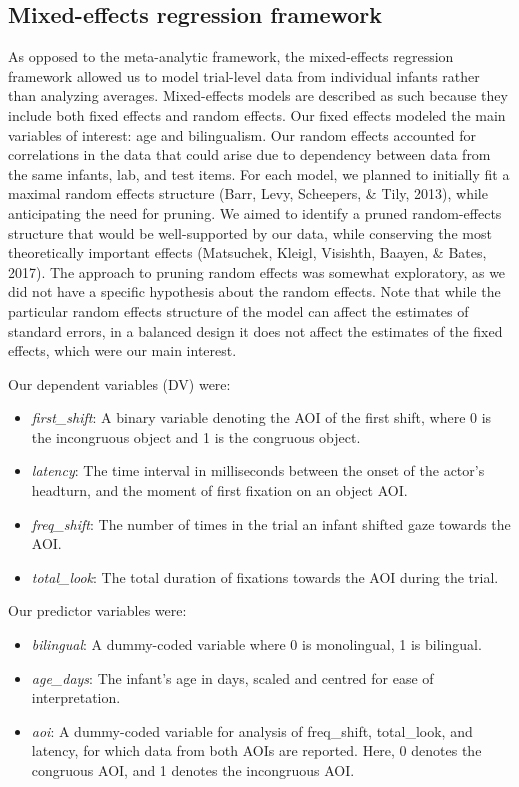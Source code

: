 \documentclass[,man,floatsintext]{apa6}
\begin{document}
\hypertarget{mixed-effects-regression-framework}{%
\subsection{Mixed-effects regression framework}\label{mixed-effects-regression-framework}}

As opposed to the meta-analytic framework, the mixed-effects regression framework allowed us to model trial-level data from individual infants rather than analyzing averages. Mixed-effects models are described as such because they include both fixed effects and random effects. Our fixed effects modeled the main variables of interest: age and bilingualism. Our random effects accounted for correlations in the data that could arise due to dependency between data from the same infants, lab, and test items. For each model, we planned to initially fit a maximal random effects structure (Barr, Levy, Scheepers, \& Tily, 2013), while anticipating the need for pruning. We aimed to identify a pruned random-effects structure that would be well-supported by our data, while conserving the most theoretically important effects (Matsuchek, Kleigl, Visishth, Baayen, \& Bates, 2017). The approach to pruning random effects was somewhat exploratory, as we did not have a specific hypothesis about the random effects. Note that while the particular random effects structure of the model can affect the estimates of standard errors, in a balanced design it does not affect the estimates of the fixed effects, which were our main interest.

Our dependent variables (DV) were:

\begin{itemize}
\item
  \emph{first\_shift}: A binary variable denoting the AOI of the first shift, where 0 is the incongruous object and 1 is the congruous object.
\item
  \emph{latency}: The time interval in milliseconds between the onset of the actor's headturn, and the moment of first fixation on an object AOI.
\item
  \emph{freq\_shift}: The number of times in the trial an infant shifted gaze towards the AOI.
\item
  \emph{total\_look}: The total duration of fixations towards the AOI during the trial.
\end{itemize}

Our predictor variables were:

\begin{itemize}
\item
  \emph{bilingual}: A dummy-coded variable where 0 is monolingual, 1 is bilingual.
\item
  \emph{age\_days}: The infant's age in days, scaled and centred for ease of interpretation.
\item
  \emph{aoi}: A dummy-coded variable for analysis of freq\_shift, total\_look, and latency, for which data from both AOIs are reported. Here, 0 denotes the congruous AOI, and 1 denotes the incongruous AOI.
\end{itemize}
\end{document}
